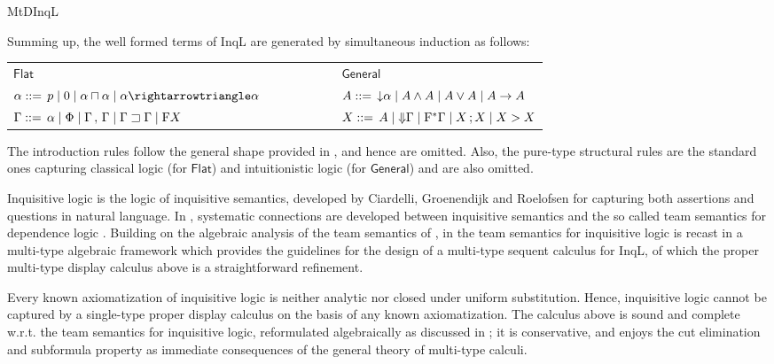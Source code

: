 \begin{entry}{MtDInqL}
\begin{clarifications}
Summing up, the well formed terms of InqL are generated by simultaneous induction as follows: 
\begin{center}
\setlength{\tabcolsep}{0.4em}
\begin{tabular}{lcl}
$\mathsf{Flat}$ & \ \ \ \ \ \ \ \ \ & $\mathsf{General}$\\
$\alpha ::= \,p \mid 0 \mid \alpha \cand \alpha \mid \alpha \cra \alpha$ & & $A ::= \,{\downarrow} \alpha \mid A \wedge A \mid A \vee A \mid A \to A$ \\
$\Gamma ::= \,\alpha \mid \Phi \mid \Gamma \,,\, \Gamma \mid \Gamma \sqsupset \Gamma\mid \mathrm{F} X$ & & $X ::= \,A\mid{\Downarrow} \Gamma\mid \mathrm{F}^*\Gamma \mid X \,; X \mid X > X$ \\
\end{tabular}
\end{center}

The introduction rules follow the general shape provided in , and hence are omitted. Also, the pure-type structural rules are the standard ones capturing classical logic (for $\mathsf{Flat}$) and intuitionistic logic (for $\mathsf{General}$) and are also omitted. 
\end{clarifications}


\begin{history}
Inquisitive logic is the logic of inquisitive semantics, developed by Ciardelli, Groenendijk and Roelofsen \cite{GroenendijkRoelofsen2009,CiardelliRoelofsen2011} for capturing both assertions and questions in natural language. In \cite{Yang2014}, systematic connections are developed between inquisitive semantics and the so called team semantics for dependence logic \cite{Vaananen2007}. Building on the algebraic analysis of the team semantics of \cite{AbramskyVaanaanen2009}, in  
 \cite{FrittellaGrecoPalmigianoYang2016}  the team semantics for inquisitive logic is recast in a multi-type algebraic framework which provides the guidelines for the design of a multi-type sequent calculus for InqL, of which the proper multi-type display calculus  above is a straightforward refinement. 
\end{history}

\begin{technicalities}
Every known axiomatization of inquisitive logic is neither analytic nor closed under uniform substitution. Hence, inquisitive logic cannot be captured by a single-type proper display calculus on the basis of any known axiomatization. The calculus above is sound and complete w.r.t. the team semantics for inquisitive logic, reformulated algebraically as discussed in \cite{FrittellaGrecoPalmigianoYang2016}; it is conservative, and enjoys the cut elimination and subformula property as immediate consequences of the general theory of multi-type calculi. 
\end{technicalities}

\end{entry}
